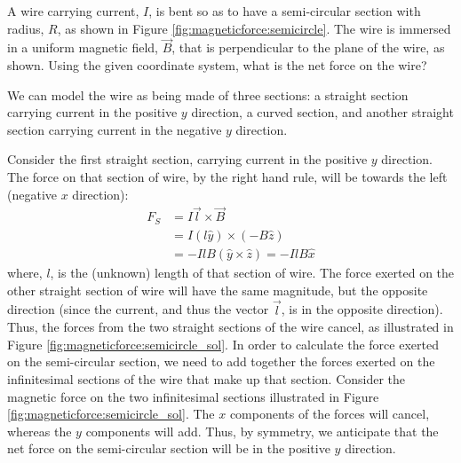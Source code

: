 \begin{example}{\label{ex:magneticforce:semicircle}A wire carrying current, $I$, is bent so as to have a semi-circular section with radius, $R$, as shown in Figure \ref{fig:magneticforce:semicircle}. The wire is immersed in a uniform magnetic field, $\vec B$, that is perpendicular to the plane of the wire, as shown. Using the given coordinate system, what is the net force on the wire? }

We can model the wire as being made of three sections: a straight section carrying current in the positive $y$ direction, a curved section, and another straight section carrying current in the negative $y$ direction.

Consider the first straight section, carrying current in the positive $y$ direction. The force on that section of wire, by the right hand rule, will be towards the left (negative $x$ direction):
\begin{align*}
F_S &= I \vec l \times \vec B\\
&= I (l\hat y) \times (-B\hat z)\\
&= -IlB (\hat y \times \hat z)=-IlB\hat x
\end{align*}
where, $l$, is the (unknown) length of that section of wire. The force exerted on the other straight section of wire will have the same magnitude, but the opposite direction (since the current, and thus the vector $\vec l$, is in the opposite direction). Thus, the forces from the two straight sections of the wire cancel, as illustrated in Figure \ref{fig:magneticforce:semicircle_sol}.
In order to calculate the force exerted on the semi-circular section, we need to add together the forces exerted on the infinitesimal sections of the wire that make up that section. Consider the magnetic force on the two infinitesimal sections illustrated in Figure \ref{fig:magneticforce:semicircle_sol}. The $x$ components of the forces will cancel, whereas the $y$ components will add. Thus, by symmetry, we anticipate that the net force on the semi-circular section will be in the positive $y$ direction.


\end{example}
